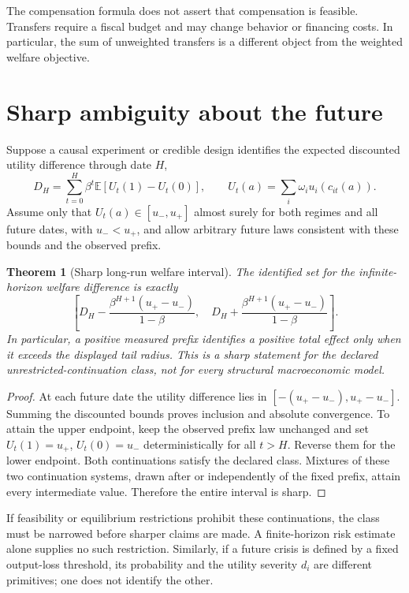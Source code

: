 \documentclass[11pt]{article}
\newtheorem{theorem}{Theorem}
\theoremstyle{remark}\newtheorem{remark}[theorem]{Remark}
\newcommand{\E}{\mathbb E}
\begin{document}
The compensation formula does not assert that compensation is feasible. Transfers require a fiscal budget and may change behavior or financing costs. In particular, the sum of unweighted transfers is a different object from the weighted welfare objective.

\section*{Sharp ambiguity about the future}
Suppose a causal experiment or credible design identifies the expected discounted utility difference through date $H$,
\[
 D_H=\sum_{t=0}^H\beta^t\E[U_t(1)-U_t(0)],
 \qquad U_t(a)=\sum_i\omega_i u_i(c_{it}(a)).
\]
Assume only that $U_t(a)\in[u_-,u_+]$ almost surely for both regimes and all future dates, with $u_-<u_+$, and allow arbitrary future laws consistent with these bounds and the observed prefix.

\begin{theorem}[Sharp long-run welfare interval]
The identified set for the infinite-horizon welfare difference is exactly
\[
 \left[D_H-\frac{\beta^{H+1}(u_+-u_-)}{1-\beta},\quad
 D_H+\frac{\beta^{H+1}(u_+-u_-)}{1-\beta}\right].
\]
In particular, a positive measured prefix identifies a positive total effect only when it exceeds the displayed tail radius. This is a sharp statement for the declared unrestricted-continuation class, not for every structural macroeconomic model.
\end{theorem}
\begin{proof}
At each future date the utility difference lies in $[-(u_+-u_-),u_+-u_-]$. Summing the discounted bounds proves inclusion and absolute convergence. To attain the upper endpoint, keep the observed prefix law unchanged and set $U_t(1)=u_+$, $U_t(0)=u_-$ deterministically for all $t>H$. Reverse them for the lower endpoint. Both continuations satisfy the declared class. Mixtures of these two continuation systems, drawn after or independently of the fixed prefix, attain every intermediate value. Therefore the entire interval is sharp.
\end{proof}

If feasibility or equilibrium restrictions prohibit these continuations, the class must be narrowed before sharper claims are made. A finite-horizon risk estimate alone supplies no such restriction. Similarly, if a future crisis is defined by a fixed output-loss threshold, its probability and the utility severity $d_i$ are different primitives; one does not identify the other.
\end{document}
